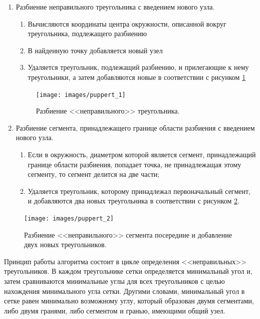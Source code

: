 \documentclass[14pt]{extreport}
\begin{document}
\begin{enumerate}

\item Разбиение неправильного треугольника с введением нового узла.

\begin{enumerate}

\item Вычисляются координаты центра окружности, описанной вокруг треугольника, подлежащего разбиению

\item В найденную точку добавляется новый узел

\item Удаляется треугольник, подлежащий разбиению, и прилегающие к нему треугольники, а затем добавляются новые в соответствии с рисунком \ref{img:triangle:1}

\end{enumerate}

\begin{figure}[H]
\centerline{\texttt{[image: images/puppert\_1]}}
\caption{Разбиение <<неправильного>> треугольника.}
\label{img:triangle:1}
\end{figure}

\item Разбиение сегмента, принадлежащего границе области разбиения с введением нового узла. 

\begin{enumerate}

\item Если в окружность, диаметром которой является сегмент, принадлежащий границе области разбиения, попадает точка, не принадлежащая этому сегменту, то сегмент делится на две части;

\item Удаляется треугольник, которому принадлежал первоначальный сегмент, и добавляются два новых треугольника в соответствии с рисунком \ref{img:triangle:2}.

\end{enumerate}
\end{enumerate}


\begin{figure}[H]
\centerline{\texttt{[image: images/puppert\_2]}}
\caption{Разбиение <<неправильного>> сегмента посередине и добавление двух новых треугольников.}
\label{img:triangle:2}
\end{figure}


Принцип работы алгоритма состоит в цикле определения <<неправильных>> треугольников. В каждом треугольнике сетки определяется минимальный угол и, затем сравниваются минимальные углы для всех треугольников с целью нахождения минимального угла сетки. Другими словами, минимальный угол в сетке равен минимально возможному углу, который образован двумя сегментами, либо двумя гранями, либо сегментом и гранью, имеющими общий узел.
\end{document}
